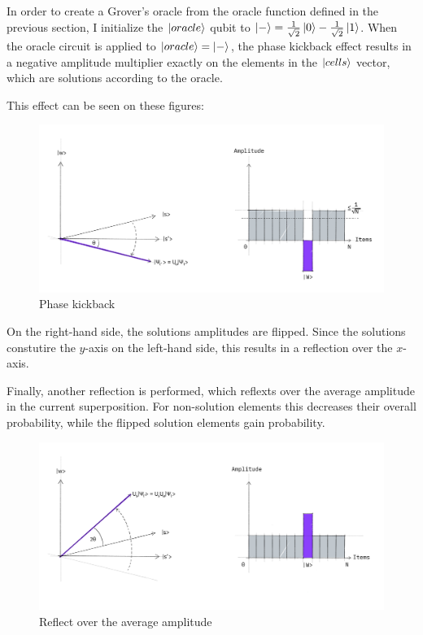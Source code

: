 In order to create a Grover's oracle from the oracle function defined in the previous section, I initialize the $\ket{oracle}$ qubit to $\ket{-} = \frac{1}{\sqrt{2}}\ket{0} - \frac{1}{\sqrt{2}}\ket{1}$. When the oracle circuit is applied to $\ket{oracle} = \ket{-}$, the phase kickback effect results in a negative amplitude multiplier exactly on the elements in the $\ket{cells}$ vector, which are solutions according to the oracle.

This effect can be seen on these figures:

\begin{figure}[H]
  \centering
    \includegraphics[width=\linewidth]{content/assets/03_grovers_algorithm/grover_step2.jpg}
    \caption{Phase kickback\cite{GroverQiskitTextbook}}
\end{figure}

On the right-hand side, the solutions amplitudes are flipped. Since the solutions constutire the $y$-axis on the left-hand side, this results in a reflection over the $x$-axis.

Finally, another reflection is performed, which reflexts over the average amplitude in the current superposition. For non-solution elements this decreases their overall probability, while the flipped solution elements gain probability.
\begin{figure}[H]
  \centering
    \includegraphics[width=\linewidth]{content/assets/03_grovers_algorithm/grover_step3.jpg}
    \caption{Reflect over the average amplitude\cite{GroverQiskitTextbook}}
\end{figure}


